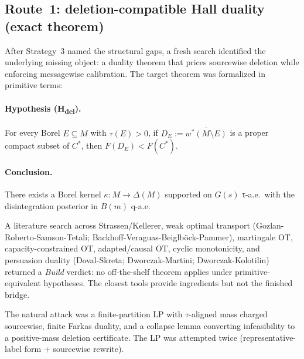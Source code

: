 \documentclass[11pt]{article}
\theoremstyle{definition}
\theoremstyle{remark}
\begin{document}
\subsection{Route~1: deletion-compatible Hall duality (exact theorem)}\label{sec:route1}

After Strategy~3 named the structural gaps, a fresh search identified
the underlying missing object: a duality theorem that prices
sourcewise deletion while enforcing messagewise calibration. The
target theorem was formalized in primitive terms:

\paragraph{Hypothesis (H\textsubscript{del}).} For every Borel
$E\subseteq M$ with $\tau(E)>0$, if $D_E := \overline{w^*(M\setminus E)}$
is a proper compact subset of $C^*$, then $F(D_E) < F(C^*)$.

\paragraph{Conclusion.} There exists a Borel kernel $\kappa: M\to\Delta(M)$
supported on $G(s)$ τ-a.e.\ with the disintegration posterior in
$B(m)$ q-a.e.

A literature search across Strassen/Kellerer, weak optimal transport
(Gozlan-Roberto-Samson-Tetali; Backhoff-Veraguas-Beigl\-böck-Pammer),
martingale OT, capacity-constrained OT, adapted/causal OT, cyclic
monotonicity, and persuasion duality (Doval-Skreta;
Dworczak-Martini; Dworczak-Kolotilin) returned a \emph{Build}
verdict: no off-the-shelf theorem applies under primitive-equivalent
hypotheses. The closest tools provide ingredients but not the
finished bridge.

The natural attack was a finite-partition LP with $\tau$-aligned
mass charged sourcewise, finite Farkas duality, and a collapse lemma
converting infeasibility to a positive-mass deletion certificate. The
LP was attempted twice (representative-label form + sourcewise rewrite).
\end{document}
